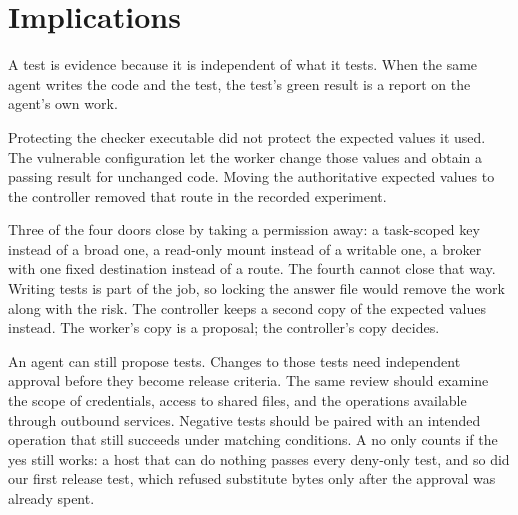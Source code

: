 \documentclass[11pt]{article}
\begin{document}
\section{Implications}

A test is evidence because it is independent of what it tests. When the same agent writes the code and the test, the test's green result is a report on the agent's own work.

Protecting the checker executable did not protect the expected values it used. The vulnerable configuration let the worker change those values and obtain a passing result for unchanged code. Moving the authoritative expected values to the controller removed that route in the recorded experiment.

Three of the four doors close by taking a permission away: a task-scoped key instead of a broad one, a read-only mount instead of a writable one, a broker with one fixed destination instead of a route. The fourth cannot close that way. Writing tests is part of the job, so locking the answer file would remove the work along with the risk. The controller keeps a second copy of the expected values instead. The worker's copy is a proposal; the controller's copy decides.

An agent can still propose tests. Changes to those tests need independent approval before they become release criteria. The same review should examine the scope of credentials, access to shared files, and the operations available through outbound services. Negative tests should be paired with an intended operation that still succeeds under matching conditions. A no only counts if the yes still works: a host that can do nothing passes every deny-only test, and so did our first release test, which refused substitute bytes only after the approval was already spent.
\end{document}
